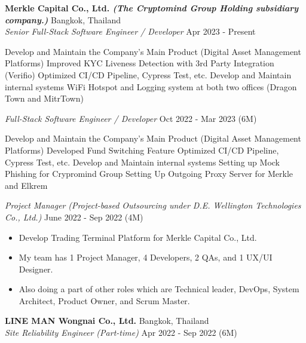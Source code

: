 \textbf{Merkle Capital Co., Ltd. \textit{\tiny{(The Cryptomind Group Holding subsidiary company.)}}} \hfill Bangkok, Thailand\\
\textit{Senior Full-Stack Software Engineer / Developer} \hfill Apr 2023 - Present\\
\vspace{-1mm}
\begin{outline}
	\1 Develop and Maintain the Company's Main Product (Digital Asset Management Platforms)
		\2 Improved KYC Liveness Detection with 3rd Party Integration (Verifio)
		\2 Optimized CI/CD Pipeline, Cypress Test, etc.
	\1 Develop and Maintain internal systems
		\2 WiFi Hotspot and Logging system at both two offices (Dragon Town and MitrTown)
\end{outline}
\vspace{-1mm}
\textit{Full-Stack Software Engineer / Developer} \hfill Oct 2022 - Mar 2023 (6M)\\
\vspace{-1mm}
\begin{outline}
	\1 Develop and Maintain the Company's Main Product (Digital Asset Management Platforms)
		\2 Developed Fund Switching Feature
		\2 Optimized CI/CD Pipeline, Cypress Test, etc.
	\1 Develop and Maintain internal systems
		\2 Setting up Mock Phishing for Crypromind Group
		\2 Setting Up Outgoing Proxy Server for Merkle and Elkrem
\end{outline}
\vspace{-1mm}
\textit{Project Manager} \textit{\tiny (Project-based Outsourcing under D.E. Wellington Technologies Co., Ltd.)} \hfill June 2022 - Sep 2022 (4M)\\
\vspace{-1mm}
\begin{itemize}
	\item Develop Trading Terminal Platform for Merkle Capital Co., Ltd.
	\item My team has 1 Project Manager, 4 Developers, 2 QAs, and 1 UX/UI Designer.
	\item Also doing a part of other roles which are Technical leader, DevOps, System Architect, Product Owner, and Scrum Master.
\end{itemize}
\vspace{-1mm}
\textbf{LINE MAN Wongnai Co., Ltd.} \hfill Bangkok, Thailand\\
\textit{Site Reliability Engineer (Part-time)} \hfill Apr 2022 - Sep 2022 (6M)\\
\vspace{-1mm}
